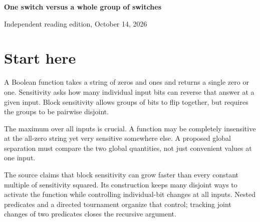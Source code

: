 \documentclass[11pt]{article}
\begin{document}
\begin{center}{\LARGE\bfseries One switch versus a whole group of switches}\par\vspace{12pt}{\large An illustrated reader for sensitivity and block sensitivity}\par\vspace{16pt}Independent reading edition, October 14, 2026\end{center}
\section*{Start here}A Boolean function takes a string of zeros and ones and returns a single zero or one. Sensitivity asks how many individual input bits can reverse that answer at a given input. Block sensitivity allows groups of bits to flip together, but requires the groups to be pairwise disjoint.

The maximum over all inputs is crucial. A function may be completely insensitive at the all-zero string yet very sensitive somewhere else. A proposed global separation must compare the two global quantities, not just convenient values at one input.

The source claims that block sensitivity can grow faster than every constant multiple of sensitivity squared. Its construction keeps many disjoint ways to activate the function while controlling individual-bit changes at all inputs. Nested predicates and a directed tournament organize that control; tracking joint changes of two predicates closes the recursive argument.
\end{document}
